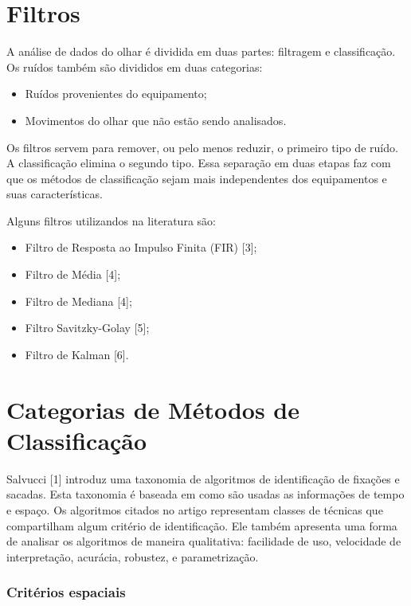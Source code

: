 \documentclass[brazil,]{report}
\begin{document}
\chapter{Filtros}\label{filtros}

A análise de dados do olhar é dividida em duas partes: filtragem e
classificação. Os ruídos também são divididos em duas categorias:

\begin{itemize}
\itemsep1pt\parskip0pt
\item
  Ruídos provenientes do equipamento;
\item
  Movimentos do olhar que não estão sendo analisados.
\end{itemize}

Os filtros servem para remover, ou pelo menos reduzir, o primeiro tipo
de ruído. A classificação elimina o segundo tipo. Essa separação em duas
etapas faz com que os métodos de classificação sejam mais independentes
dos equipamentos e suas características.

Alguns filtros utilizandos na literatura são:

\begin{itemize}
\itemsep1pt\parskip0pt
\item
  Filtro de Resposta ao Impulso Finita (FIR) {[}3{]};
\item
  Filtro de Média {[}4{]};
\item
  Filtro de Mediana {[}4{]};
\item
  Filtro Savitzky-Golay {[}5{]};
\item
  Filtro de Kalman {[}6{]}.
\end{itemize}

\chapter{Categorias de Métodos de
Classificação}\label{categorias-de-muxe9todos-de-classificauxe7uxe3o}

Salvucci {[}1{]} introduz uma taxonomia de algoritmos de identificação
de fixações e sacadas. Esta taxonomia é baseada em como são usadas as
informações de tempo e espaço. Os algoritmos citados no artigo
representam classes de técnicas que compartilham algum critério de
identificação. Ele também apresenta uma forma de analisar os algoritmos
de maneira qualitativa: facilidade de uso, velocidade de interpretação,
acurácia, robustez, e parametrização.

\subsection{Critérios espaciais}\label{crituxe9rios-espaciais}
\end{document}
